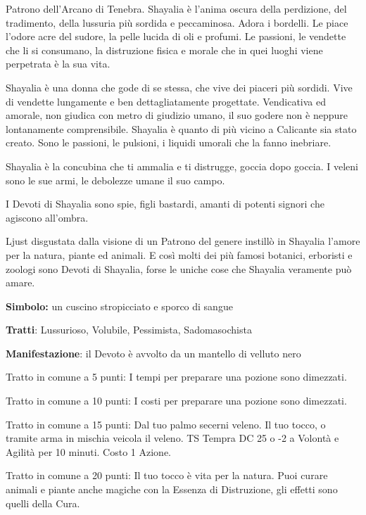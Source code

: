 \documentclass[a4paper,11pt,twoside,openany]{book}
\begin{document}
\label{shayalia}

Patrono dell'Arcano di Tenebra. Shayalia è l'anima oscura della perdizione, del tradimento, della lussuria più sordida e peccaminosa. Adora i bordelli. Le piace l'odore acre del sudore, la pelle lucida di oli e profumi. Le passioni, le vendette che li si consumano, la distruzione fisica e morale che in quei luoghi viene perpetrata è la sua vita.

Shayalia è una donna che gode di se stessa, che vive dei piaceri più sordidi. Vive di vendette lungamente e ben dettagliatamente progettate. Vendicativa ed amorale, non giudica con metro di giudizio umano, il suo godere non è neppure lontanamente comprensibile. Shayalia è quanto di più vicino a Calicante sia stato creato. Sono le passioni, le pulsioni, i liquidi umorali che la fanno inebriare.

Shayalia è la concubina che ti ammalia e ti distrugge, goccia dopo goccia. I veleni sono le sue armi, le debolezze umane il suo campo.

I Devoti di Shayalia sono spie, figli bastardi, amanti di potenti signori che agiscono all'ombra.

Ljust disgustata dalla visione di un Patrono del genere instillò in Shayalia l'amore per la natura, piante ed animali. E così molti dei più famosi botanici, erboristi e zoologi sono Devoti di Shayalia, forse le uniche cose che Shayalia veramente può amare.

\textbf{Simbolo:} un cuscino stropicciato e sporco di sangue

\textbf{Tratti}: Lussurioso, Volubile, Pessimista, Sadomasochista

\textbf{Manifestazione}: il Devoto è avvolto da un mantello di velluto nero

\bigskip

Tratto in comune a 5 punti: I tempi per preparare una pozione sono dimezzati.

Tratto in comune a 10 punti: I costi per preparare una pozione sono dimezzati.

Tratto in comune a 15 punti: Dal tuo palmo secerni veleno. Il tuo tocco, o tramite arma in mischia veicola il veleno. TS Tempra DC 25 o -2 a Volontà e Agilità per 10 minuti. Costo 1 Azione.

Tratto in comune a 20 punti: Il tuo tocco è vita per la natura. Puoi curare animali e piante anche magiche con la Essenza di Distruzione, gli effetti sono quelli della Cura.

\bigskip
\end{document}
